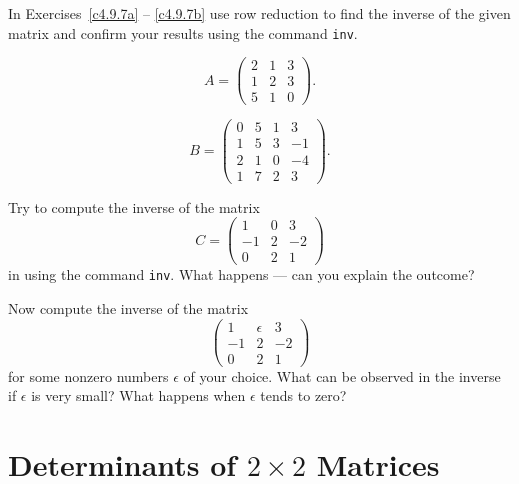 \CEXER

\noindent In Exercises~\ref{c4.9.7a} -- \ref{c4.9.7b} use row reduction
to find the inverse of the given matrix and confirm your results using the 
command {\tt inv}.
\begin{exercise} \label{c4.9.7a}
\begin{equation*}
A=\left(\begin{array}{ccc} 2 & 1 & 3\\ 1 & 2 & 3 \\ 5& 1 & 0
\end{array}\right).
\end{equation*}
\end{exercise}
\begin{exercise} \label{c4.9.7b}
\begin{equation*}
B= \left(\begin{array}{cccr} 0 & 5 & 1 & 3\\ 1 & 5 & 3 & -1\\ 2 & 1 &
0 & -4 \\ 1 & 7 & 2 & 3 \end{array}\right).
\end{equation*}
\end{exercise}

\begin{exercise} \label{c4.9.8}
Try to compute the inverse of the matrix
\begin{equation*}
C = \left(\begin{array}{rrr} 1 & 0 & 3\\ -1 & 2 & -2 \\ 0& 2 & 1
\end{array}\right)
\end{equation*}
in \Matlab using the command {\tt inv}.  What happens --- can you
explain the outcome?

Now compute the inverse of the matrix
\[
\left(\begin{array}{rrr} 1 & \epsilon & 3\\ -1 & 2 & -2 \\ 0& 2 & 1
\end{array}\right)
\]
for some nonzero numbers $\epsilon$ of your choice.  What can be observed
in the inverse if $\epsilon$ is very small?  What happens when $\epsilon$
tends to zero?
\end{exercise}


\section{Determinants of $2\times 2$ Matrices}
\label{S:det2x2}

